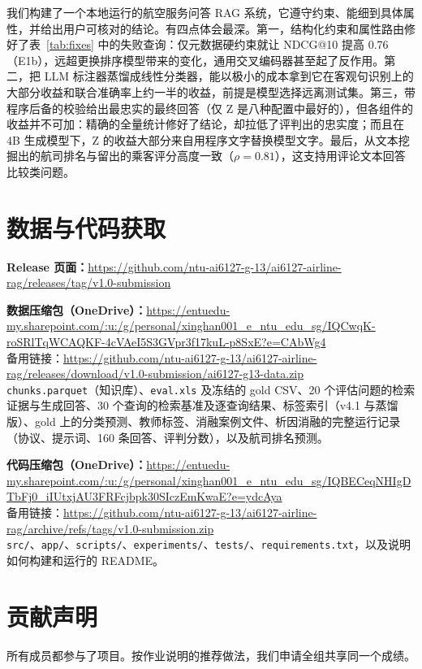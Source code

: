 \documentclass[10pt,twocolumn,a4paper]{article}
\begin{document}
我们构建了一个本地运行的航空服务问答 RAG 系统，它遵守约束、能细到具体属性，并给出用户可核对的结论。有四点体会最深。第一，结构化约束和属性路由修好了表~\ref{tab:fixes} 中的失败查询：仅元数据硬约束就让 NDCG@10 提高 0.76（E1b），远超更换排序模型带来的变化，通用交叉编码器甚至起了反作用。第二，把 LLM 标注器蒸馏成线性分类器，能以极小的成本拿到它在客观句识别上的大部分收益和联合准确率上约一半的收益，前提是模型选择远离测试集。第三，带程序后备的校验给出最忠实的最终回答（仅 Z 是八种配置中最好的），但各组件的收益并不可加：精确的全量统计修好了结论，却拉低了评判出的忠实度；而且在 4B 生成模型下，Z 的收益大部分来自用程序文字替换模型文字。最后，从文本挖掘出的航司排名与留出的乘客评分高度一致（$\rho=0.81$），这支持用评论文本回答比较类问题。

\section*{数据与代码获取}

\textbf{Release 页面：}\url{https://github.com/ntu-ai6127-g-13/ai6127-airline-rag/releases/tag/v1.0-submission}

\textbf{数据压缩包（OneDrive）：}\url{https://entuedu-my.sharepoint.com/:u:/g/personal/xinghan001_e_ntu_edu_sg/IQCwqK-roSRlTqWCAQKF-4cVAeI5S3GVpr3f17kuL-p8SxE?e=CAbWg4}\\
备用链接：\url{https://github.com/ntu-ai6127-g-13/ai6127-airline-rag/releases/download/v1.0-submission/ai6127-g13-data.zip}\\
\nolinkurl{chunks.parquet}（知识库）、\texttt{eval.xls} 及冻结的 gold CSV、20 个评估问题的检索证据与生成回答、30 个查询的检索基准及逐查询结果、标签索引（v4.1 与蒸馏版）、gold 上的分类预测、教师标签、消融案例文件、析因消融的完整运行记录（协议、提示词、160 条回答、评判分数），以及航司排名预测。

\textbf{代码压缩包（OneDrive）：}\url{https://entuedu-my.sharepoint.com/:u:/g/personal/xinghan001_e_ntu_edu_sg/IQBECeqNHIgDTbFj0_iIUtxjAU3FRFcjbpk30SIczEmKwaE?e=ydcAya}\\
备用链接：\url{https://github.com/ntu-ai6127-g-13/ai6127-airline-rag/archive/refs/tags/v1.0-submission.zip}\\
\nolinkurl{src/}、\nolinkurl{app/}、\nolinkurl{scripts/}、\nolinkurl{experiments/}、\nolinkurl{tests/}、\nolinkurl{requirements.txt}，以及说明如何构建和运行的 README。

\section*{贡献声明}
所有成员都参与了项目。按作业说明的推荐做法，我们申请全组共享同一个成绩。
\end{document}
